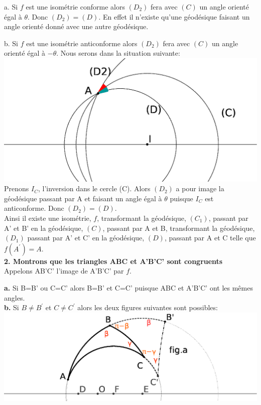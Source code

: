 \documentclass[a4paper, 12pt, twoside]{book}
\begin{document}
 a. Si $f$ est une isométrie conforme alors $(D_{2})$ fera avec $(C)$ un angle orienté égal à $\theta$.  Donc $(D_{2})=(D)$. En effet il n'existe qu'une géodésique faisant un angle orienté donné avec une autre géodésique.\
 
 b. Si $f$ est une isométrie anticonforme alors $(D_{2})$ fera avec $(C)$ un angle orienté égal à $-\theta$. Nous serons dans la situation suivante:\\
 
  
   \includegraphics[scale=0.5]{figures/hyper18.eps} \\   
 
 
   Prenons $I_{C}$, l'inversion dans le cercle (C). Alors $(D_{2})$ a pour image la géodésique passant par A et faisant un angle égal à $\theta$ puisque $I_{C}$ est anticonforme. Donc $(D_{2})=(D)$.\\
   
   Ainsi il existe une isométrie, $f$,  transformant la géodésique, $(C_{1})$, passant par A' et B' en   la géodésique, $(C)$, passant par A et B, transformant la géodésique, $(D_{1})$  passant par A' et C' en   la géodésique,  $(D)$, passant par A et C telle que $f(A^{'})=A$. \\
   
  \textbf{2. Montrons que les triangles ABC et A'B'C' sont congruents} \\
   
  Appelons AB'C' l'image de A'B'C' par $f$.
  
  \textbf{a.} Si B=B' ou C=C' alors B=B' et C=C' puisque ABC et A'B'C' ont les mêmes angles.\\
  
  \textbf{b.} Si $B\neq B^{'}$ et $C\neq C^{'}$ alors les deux figures suivantes sont possibles:\\ 
 
 
 \includegraphics[scale=0.7]{figures/hyper14.eps}
 
\end{document}

